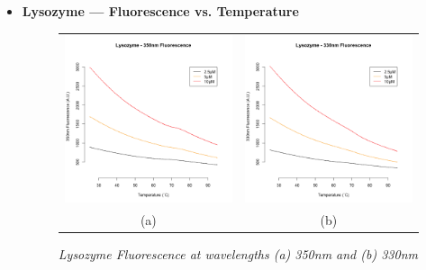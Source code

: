 \documentclass[a4paper,10pt]{article}
\begin{document}
            \begin{itemize}
                \item {\bfseries Lysozyme --- Fluorescence vs. Temperature}
                \begin{figure}[H]
                    \centering
                    \begin{tabular}{cc}
                        \includegraphics[width=200px]{../resources/unfolding_lys_350.png} &
                        \includegraphics[width=200px]{../resources/unfolding_lys_330.png} \\
                        (a) & (b)\\
                    \end{tabular}
                    \caption{\it Lysozyme Fluorescence at wavelengths (a) 350nm and (b) 330nm}\label{fig:lys_flr}
                \end{figure}
                

\end{itemize}
\end{document}
